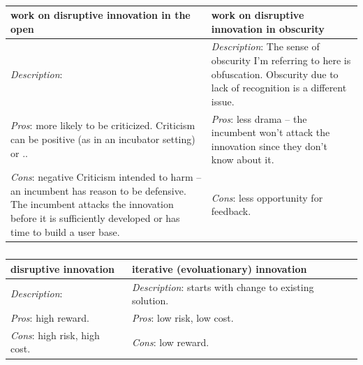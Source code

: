 \begin{center}
\begin{table}[ht]
\begin{tabular}{ | m{\dilemmatablewidth}| m{\dilemmatablewidth} | } 
  \hline
  \textbf{work on disruptive innovation in the open} &
  \textbf{work on disruptive innovation in obscurity} \\
  \hline
  \textit{Description}:  &
  \textit{Description}: The sense of obscurity I'm referring to here is obfuscation. Obscurity due to lack of recognition is a different issue.  \\  
  \hline
  \textit{Pros}: more likely to be criticized. Criticism can be positive (as in an incubator setting) or .. & 
  \textit{Pros}: less drama -- the incumbent won't attack the innovation since they don't know about it. \\
  \hline
  \textit{Cons}: negative Criticism intended to harm -- an incumbent has reason to be defensive. The incumbent attacks the innovation before it is sufficiently developed or has time to build a user base. & 
  \textit{Cons}: less opportunity for feedback. \\
  \hline
\end{tabular}
\caption{
}
\label{table:innovate-open-obscure}
\end{table}
\end{center}

\begin{center}
\begin{table}[ht]
\begin{tabular}{ | m{\dilemmatablewidth}| m{\dilemmatablewidth} | } 
  \hline
  \textbf{disruptive innovation} &
  \textbf{iterative (evoluationary) innovation} \\
  \hline
  \textit{Description}:   &
  \textit{Description}: starts with change to existing solution.  \\  
  \hline
  \textit{Pros}: high reward. & 
  \textit{Pros}: low risk, low cost. \\
  \hline
  \textit{Cons}: high risk, high cost. & 
  \textit{Cons}: low reward. \\
  \hline
\end{tabular}
\caption{
}
\label{table:disruptive-or-iterative}
\end{table}
\end{center}

